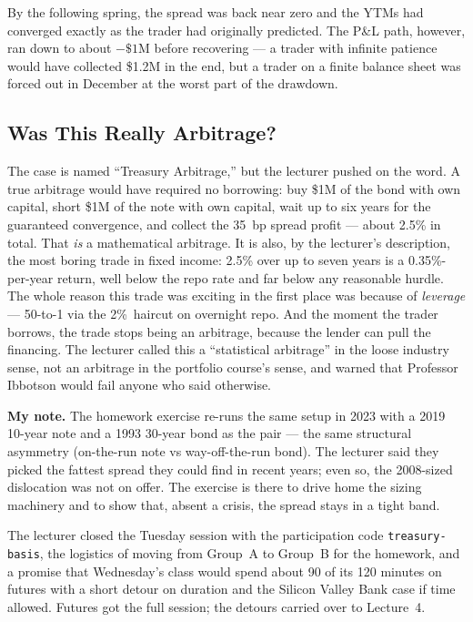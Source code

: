 By the following spring, the spread was back near zero and the YTMs had
converged exactly as the trader had originally predicted. The P\&L path,
however, ran down to about $-\$1$M before recovering --- a trader with
infinite patience would have collected \$1.2M in the end, but a trader on
a finite balance sheet was forced out in December at the worst part of the
drawdown.

\subsection{Was This Really Arbitrage?}\label{L3-sec:case-arb}

The case is named ``Treasury Arbitrage,'' but the lecturer pushed on the
word. A true arbitrage would have required no borrowing: buy \$1M of the
bond with own capital, short \$1M of the note with own capital, wait up to
six years for the guaranteed convergence, and collect the 35~bp spread
profit --- about 2.5\% in total. That \emph{is} a mathematical arbitrage. It
is also, by the lecturer's description, the most boring trade in fixed
income: 2.5\% over up to seven years is a 0.35\%-per-year return,
well below the repo rate and far below any reasonable hurdle. The whole
reason this trade was exciting in the first place was because of
\emph{leverage} --- 50-to-1 via the 2\%~haircut on overnight repo. And the
moment the trader borrows, the trade stops being an arbitrage, because the
lender can pull the financing. The lecturer called this a ``statistical
arbitrage'' in the loose industry sense, not an arbitrage in the portfolio
course's sense, and warned that Professor Ibbotson would fail anyone who
said otherwise.

\begin{checkpoint}
\textbf{My note.} The homework exercise re-runs the same setup in 2023 with
a 2019 10-year note and a 1993 30-year bond as the pair --- the same
structural asymmetry (on-the-run note vs way-off-the-run bond). The
lecturer said they picked the fattest spread they could find in recent
years; even so, the 2008-sized dislocation was not on offer. The exercise
is there to drive home the sizing machinery and to show that, absent a
crisis, the spread stays in a tight band.
\end{checkpoint}

The lecturer closed the Tuesday session with the participation code
\texttt{treasury-basis}, the logistics of moving from Group~A to Group~B
for the homework, and a promise that Wednesday's class would spend about
90 of its 120 minutes on futures with a short detour on duration and the
Silicon Valley Bank case if time allowed. Futures got the full session; the
detours carried over to Lecture~4.

